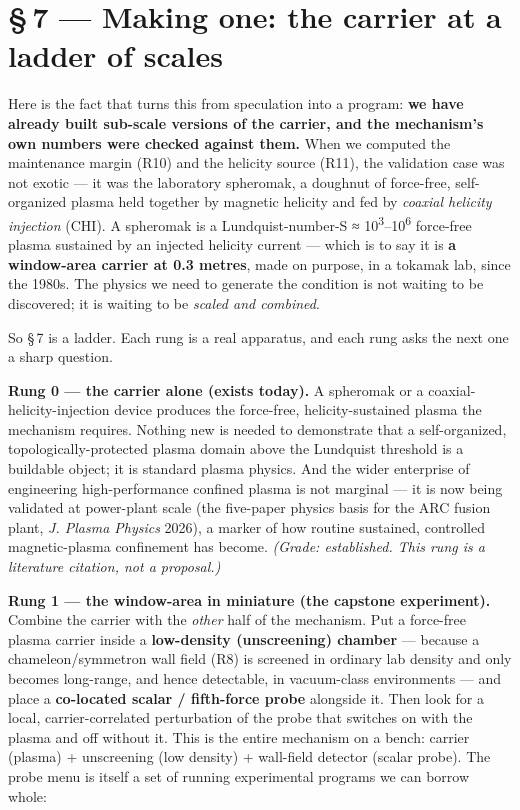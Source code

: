 \documentclass[11pt]{article}
\begin{document}
\section*{\S\,7 --- Making one: the carrier at a ladder of scales}
Here is the fact that turns this from speculation into a program: \textbf{we have already built sub-scale versions of the carrier, and the mechanism's own numbers were checked against them.} When we computed the maintenance margin (R10) and the helicity source (R11), the validation case was not exotic --- it was the laboratory spheromak, a doughnut of force-free, self-organized plasma held together by magnetic helicity and fed by \emph{coaxial helicity injection} (CHI). A spheromak is a Lundquist-number-S ≈ 10\textsuperscript{3}--10\textsuperscript{6} force-free plasma sustained by an injected helicity current --- which is to say it is \textbf{a window-area carrier at 0.3 metres}, made on purpose, in a tokamak lab, since the 1980s. The physics we need to generate the condition is not waiting to be discovered; it is waiting to be \emph{scaled and combined}.

So \S\,7 is a ladder. Each rung is a real apparatus, and each rung asks the next one a sharp question.

\textbf{Rung 0 --- the carrier alone (exists today).} A spheromak or a coaxial-helicity-injection device produces the force-free, helicity-sustained plasma the mechanism requires. Nothing new is needed to demonstrate that a self-organized, topologically-protected plasma domain above the Lundquist threshold is a buildable object; it is standard plasma physics. And the wider enterprise of engineering high-performance confined plasma is not marginal --- it is now being validated at power-plant scale (the five-paper physics basis for the ARC fusion plant, \emph{J. Plasma Physics} 2026), a marker of how routine sustained, controlled magnetic-plasma confinement has become. \emph{(Grade: established. This rung is a literature citation, not a proposal.)}

\textbf{Rung 1 --- the window-area in miniature (the capstone experiment).} Combine the carrier with the \emph{other} half of the mechanism. Put a force-free plasma carrier inside a \textbf{low-density (unscreening) chamber} --- because a chameleon/symmetron wall field (R8) is screened in ordinary lab density and only becomes long-range, and hence detectable, in vacuum-class environments --- and place a \textbf{co-located scalar / fifth-force probe} alongside it. Then look for a local, carrier-correlated perturbation of the probe that switches on with the plasma and off without it. This is the entire mechanism on a bench: carrier (plasma) + unscreening (low density) + wall-field detector (scalar probe). The probe menu is itself a set of running experimental programs we can borrow whole:
\end{document}
